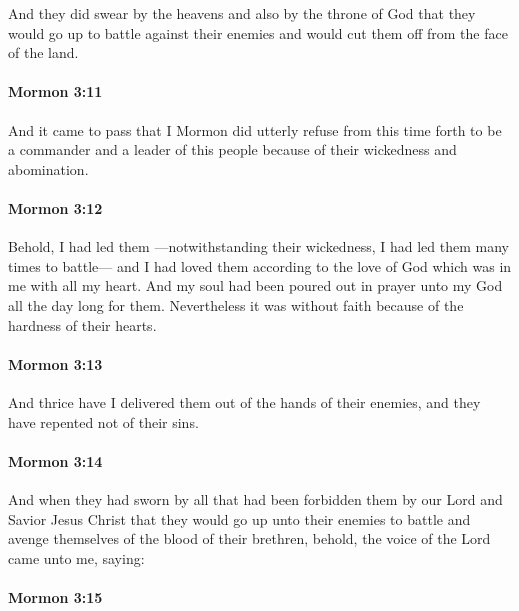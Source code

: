 			And they did swear by the heavens and also by the throne of God
			that they would go up to battle against their enemies
			and would cut them off from the face of the land.

		\paragraph{Mormon 3:11} %
			\label{MORMON-3-11}

			And it came to pass that I Mormon did utterly refuse from this time forth
			to be a commander and a leader of this people
			because of their wickedness and abomination.

		\paragraph{Mormon 3:12} %
			\label{MORMON-3-12}

			Behold, I had led them
			---notwithstanding their wickedness, I had led them many times to battle---
			and I had loved them
			according to the love of God which was in me
			with all my heart.
			And my soul had been poured out in prayer unto my God
			all the day long for them.
			Nevertheless it was without faith
			because of the hardness of their hearts.

		\paragraph{Mormon 3:13} %
			\label{MORMON-3-13}

			And thrice have I delivered them out of the hands of their enemies,
			and they have repented not of their sins.

		\paragraph{Mormon 3:14} %
			\label{MORMON-3-14}

			And when they had sworn by all
			that had been forbidden them by our Lord and Savior Jesus Christ
			that they would go up unto their enemies to battle
			and avenge themselves of the blood of their brethren,
			behold, the voice of the Lord came unto me, saying:

		\paragraph{Mormon 3:15} %
			\label{MORMON-3-15}

